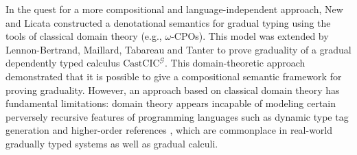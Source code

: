 \documentclass{article}
\theoremstyle{definition}
\theoremstyle{remark}
\begin{document}



In the quest for a more compositional and language-independent approach, New and
Licata \cite{new-licata18} constructed a denotational semantics for gradual
typing using the tools of classical domain theory (e.g., $\omega$-CPOs). This
model was extended by Lennon-Bertrand, Maillard, Tabareau and Tanter
\cite{gradualizing-cic} to prove graduality of a gradual dependently typed
calculus $\textrm{CastCIC}^{\mathcal G}$. This domain-theoretic approach
demonstrated that it is possible to give a compositional semantic framework for
proving graduality. However, an approach based on classical domain theory has
fundamental limitations: domain theory appears incapable of modeling certain
perversely recursive features of programming languages such as dynamic type tag
generation and higher-order references \cite{Birkedal-Stovring-Thamsborg-2009},
which are commonplace in real-world gradually typed systems as well as gradual
calculi.






\end{document}
